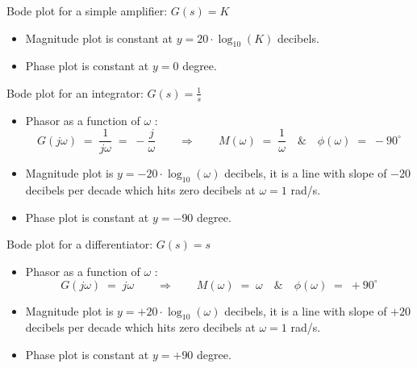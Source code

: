 \documentclass[ 10pt, xcolor = dvipsnames]{beamer}
\begin{document}
\begin{frame}[allowframebreaks]
\frametitle{\insertsection}

Bode plot for a simple amplifier: $G(s) = K$
\begin{itemize}
\item Magnitude plot is constant at $y = 20 \cdot \log_{10}(K)$ decibels. 
\item Phase plot is constant at $y = 0$ degree. 
\end{itemize}
\framebreak

Bode plot for an integrator: $\displaystyle G(s) = \frac{1}{s}$
\begin{itemize}
\item Phasor as a function of $\omega$ : 
\[
G(j\omega) \; = \; \frac{1}{j\omega} \; = \; -\frac{j}{\omega} 
\qquad \Longrightarrow \qquad
M(\omega) \; = \; \frac{1}{\omega} \quad \& \quad
\phi(\omega) \; = \; -90^{\circ}
\]
\item Magnitude plot is $y = -20 \cdot \log_{10}(\omega)$ decibels, \ie it is a line with slope of $-20$ decibels per decade which hits zero decibels at $\omega = 1$ rad/s. 
\item Phase plot is constant at $y = -90$ degree. 
\end{itemize}
\framebreak

Bode plot for a differentiator: $\displaystyle G(s) = s$
\begin{itemize}
\item Phasor as a function of $\omega$ : 
\[
G(j\omega) \; = \; j\omega \qquad \Longrightarrow \qquad
M(\omega) \; = \; \omega \quad \& \quad
\phi(\omega) \; = \; +90^{\circ}
\]
\item Magnitude plot is $y = +20 \cdot \log_{10}(\omega)$ decibels, \ie it is a line with slope of $+20$ decibels per decade which hits zero decibels at $\omega = 1$ rad/s. 
\item Phase plot is constant at $y = +90$ degree. 
\end{itemize}

\end{frame}
\end{document}
